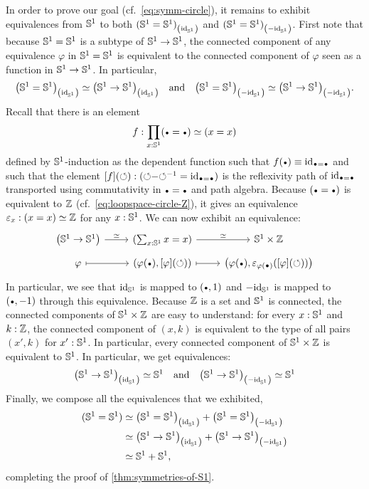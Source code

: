 \documentclass[english,a4paper]{lmcs}
\begin{document}
In order to prove our goal (cf.~\cref{eq:symm-circle}), it remains to
exhibit equivalences from ${{\mathbb S^{1}}}$ to both
${({{\mathbb S^{1}}}={{\mathbb S^{1}}})}_{\left(\mathord{\mathrm{id}}_{{\mathbb S^{1}}}\right)}$ and
${({{\mathbb S^{1}}}={{\mathbb S^{1}}})}_{\left(-\mathord{\mathrm{id}}_{{\mathbb S^{1}}}\right)}$. First note that because ${{\mathbb S^{1}}}={{\mathbb S^{1}}}$ is
a subtype of ${{\mathbb S^{1}}}\to{{\mathbb S^{1}}}$, the connected component of any equivalence
$\varphi$ in ${{\mathbb S^{1}}}={{\mathbb S^{1}}}$ is equivalent to the connected component of
$\varphi$ seen as a function in ${{\mathbb S^{1}}} \to {{\mathbb S^{1}}}$. In particular,
\begin{displaymath}
  {\left({{\mathbb S^{1}}}={{\mathbb S^{1}}}\right)}_{\left(\mathord{\mathrm{id}}_{{\mathbb S^{1}}}\right)} \simeq {\left({{\mathbb S^{1}}}\to{{\mathbb S^{1}}}\right)}_{\left(\mathord{\mathrm{id}}_{{\mathbb S^{1}}}\right)}
  \quad\text{and}\quad
  {\left({{\mathbb S^{1}}}={{\mathbb S^{1}}}\right)}_{\left(-\mathord{\mathrm{id}}_{{\mathbb S^{1}}}\right)} \simeq {\left({{\mathbb S^{1}}}\to{{\mathbb S^{1}}}\right)}_{\left(-\mathord{\mathrm{id}}_{{\mathbb S^{1}}}\right)}.
\end{displaymath}
Recall that there is an element
\begin{equation}
  \label{eq:S1-loopspace-Z-at-each-x}%
  f\from \prod_{x:\Sc} (\base=\base) \weq (x=x)
\end{equation}
defined by
${{\mathbb S^{1}}}$-induction as the dependent function such that
$f(\base) \jdeq \id_{\base=\base}$ and such that the element
$\ap f (\Sloop) \from (\Sloop\blank\inv\Sloop = \id_{\base=\base})$ is
the reflexivity path of $\id_{\base=\base}$ transported using
commutativity in $\base=\base$ and path algebra.
Because $(\base=\base)$ is equivalent
to $\mathbb{Z}$ (cf.~\cref{eq:loopspace-circle-Z}), it gives an equivalence
$\varepsilon_x: (x=x) \simeq \mathbb{Z}$ for any $x:{{\mathbb S^{1}}}$. We can now
exhibit an equivalence:
\begin{displaymath}
  \begin{tikzcd}[row sep=tiny]
    \left(\Sc \to \Sc\right) \rar["\weq"] & (\sum_{x\from\Sc}x=x)
    \rar["\weq"] & \Sc \times \ZZ
    \\
    \varphi \rar[mapsto] & (\varphi(\base),\ap \varphi (\Sloop))
    \rar[mapsto] & \left(%
      \varphi(\base), \varepsilon_{\varphi(\base)}(\ap\varphi(\Sloop))%
    \right)%
\end{tikzcd}
\end{displaymath}
In particular, we see that $\mathord{\mathrm{id}}_{{\mathbb S^{1}}}$ is mapped to $(\base,1)$
and $-\mathord{\mathrm{id}}_{{\mathbb S^{1}}}$ is mapped to $(\base,-1)$ through this
equivalence. Because $\mathbb{Z}$ is a set and ${{\mathbb S^{1}}}$ is connected, the
connected components of ${{\mathbb S^{1}}}\times\mathbb{Z}$ are easy to understand: for
every $x:{{\mathbb S^{1}}}$ and $k:\mathbb{Z}$, the connected component of $(x,k)$ is
equivalent to the type of all pairs $(x',k)$ for
$x':{{\mathbb S^{1}}}$. In particular, every connected component of
${{\mathbb S^{1}}}\times\mathbb{Z}$ is equivalent to ${{\mathbb S^{1}}}$. In particular, we get
equivalences:
\begin{displaymath}
  {\left({{\mathbb S^{1}}}\to {{\mathbb S^{1}}}\right)}_{\left(\mathord{\mathrm{id}}_{{\mathbb S^{1}}}\right)} \simeq {{\mathbb S^{1}}}
  \quad\text{and}\quad
  {\left({{\mathbb S^{1}}}\to {{\mathbb S^{1}}}\right)}_{\left(-\mathord{\mathrm{id}}_{{\mathbb S^{1}}}\right)} \simeq {{\mathbb S^{1}}}
\end{displaymath}
Finally, we compose all the equivalences that we exhibited,
\begin{align*}
  ({{\mathbb S^{1}}}={{\mathbb S^{1}}})
  & \simeq {\left({{\mathbb S^{1}}}= {{\mathbb S^{1}}}\right)}_{\left(\mathord{\mathrm{id}}_{{\mathbb S^{1}}}\right)}
    + {\left({{\mathbb S^{1}}} = {{\mathbb S^{1}}}\right)}_{\left(-\mathord{\mathrm{id}}_{{\mathbb S^{1}}}\right)}
  \\
  & \simeq {\left({{\mathbb S^{1}}}\to {{\mathbb S^{1}}}\right)}_{\left(\mathord{\mathrm{id}}_{{\mathbb S^{1}}}\right)}
    + {\left({{\mathbb S^{1}}} \to {{\mathbb S^{1}}}\right)}_{\left(-\mathord{\mathrm{id}}_{{\mathbb S^{1}}}\right)}
  \\
  & \simeq {{\mathbb S^{1}}} + {{\mathbb S^{1}}},
\end{align*}
completing the proof of \cref{thm:symmetries-of-S1}.
\end{document}
